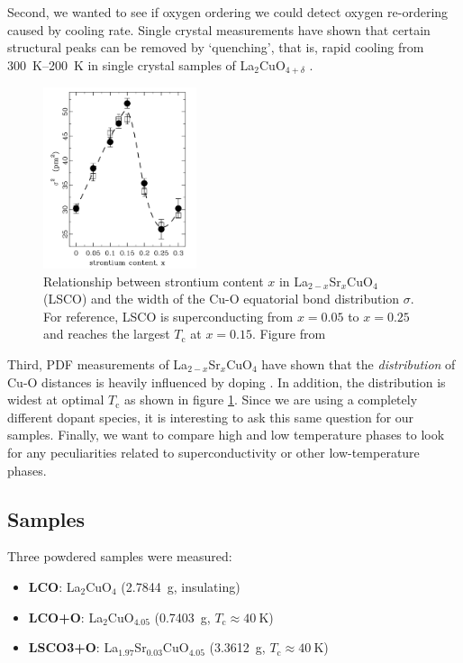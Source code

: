 Second, we wanted to see if oxygen ordering we could detect oxygen re-ordering caused by cooling rate. Single crystal measurements have shown that certain structural peaks can be removed by `quenching', that is, rapid cooling from \SIrange{300}{200}{\kelvin} in single crystal samples of La$_2$CuO$_{4+\delta}$ \cite{Poccia2012}.

\begin{figure}
    \centering
    \includegraphics[width=0.4\textwidth]{fig/pdf/bozin_cuo.png}
    \caption{Relationship between strontium content $x$ in La$_{2-x}$Sr$_x$CuO$_4$ (LSCO) and the width of the Cu-O equatorial bond distribution $\sigma$. For reference, LSCO is superconducting from $x=0.05$ to $x=0.25$ and reaches the largest $T_\text{c}$ at $x=0.15$. Figure from \cite{Bozin2000}}
    \label{fig:bozin_cuo}
\end{figure}

Third, PDF measurements of La$_{2-x}$Sr$_x$CuO$_4$ have shown that the \emph{distribution} of Cu-O distances is heavily influenced by doping \cite{Bozin2000}. In addition, the distribution is widest at optimal $T_\text{c}$ as shown in figure \ref{fig:bozin_cuo}. Since we are using a completely different dopant species, it is interesting to ask this same question for our samples. Finally, we want to compare high and low temperature phases to look for any peculiarities related to superconductivity or other low-temperature phases.

\subsection{Samples}
Three powdered samples were measured:

\begin{itemize}
    \item \textbf{LCO}: La$_2$CuO$_4$ (\SI{2.7844}{\gram}, insulating)
    \item \textbf{LCO+O}: La$_2$CuO$_{4.05}$ (\SI{0.7403}{\gram}, $T_\text{c} \approx \SI{40}{\kelvin}$)
    \item \textbf{LSCO3+O}: La$_{1.97}$Sr$_{0.03}$CuO$_{4.05}$ (\SI{3.3612}{\gram}, $T_\text{c} \approx \SI{40}{\kelvin}$)
\end{itemize}

